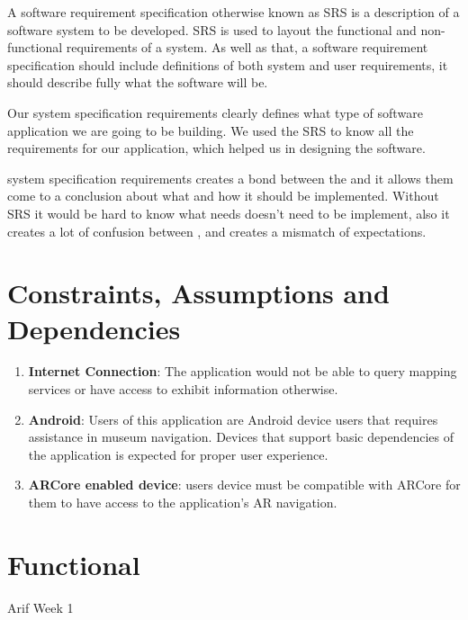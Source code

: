 A software requirement specification otherwise known as SRS is a description of a software system to be developed. SRS is used to layout the functional and non-functional requirements of a system. As well as that, a software requirement specification should include definitions of both system and user requirements, it should describe fully what the software will be. 

Our system specification requirements clearly defines what type of software application we are going to be building. We used the SRS to know all the requirements for our application, which helped us in designing the software. 

 system specification requirements creates a bond between the  and  it allows them come to a conclusion about what  and how it should be implemented. Without  SRS it would be hard to know what needs doesn't need to be implement, also it creates a lot of  confusion between , and creates a mismatch of expectations.  

\section*{Constraints, Assumptions and Dependencies}
\begin{enumerate}
    \item \textbf{Internet Connection}: The application would not be able to query mapping services or have access to exhibit information otherwise.
    \item \textbf{Android}: Users of this application are Android device users that requires assistance in museum navigation. Devices that support basic dependencies of the application is expected for proper user experience.
    \item \textbf{ARCore enabled device}: users device must be compatible with ARCore for them to have access to the application's AR navigation.
\end{enumerate}

\section{Functional}
Arif Week 1

